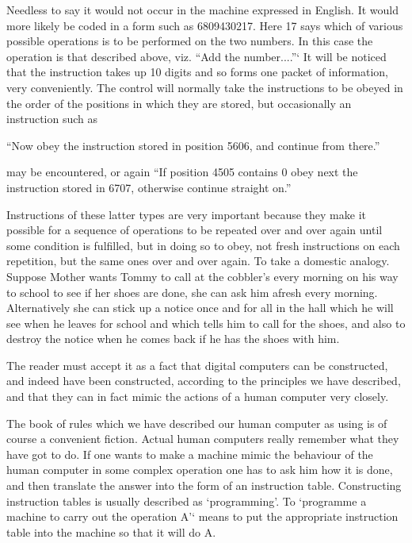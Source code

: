 \documentclass[10pt]{article} %
\begin{document}
Needless to say it would not occur in the machine expressed in English. It would more likely be coded in a form such as 6809430217. Here 17 says which of various possible operations is to be performed on the two numbers. In this case the operation is that described above, viz. ``Add the number....''` It will be noticed that the instruction takes up 10 digits and so forms one packet of information, very conveniently. The control will normally take the instructions to be obeyed in the order of the positions in which they are stored, but occasionally an instruction such as

\vspace{0.5\baselineskip} %
``Now obey the instruction stored in position 5606, and continue from there.''\par %
\vspace{0.5\baselineskip} %
may be encountered, or again
\vspace{0.5\baselineskip} %
``If position 4505 contains 0 obey next the instruction stored in 6707, otherwise continue straight on.''\par %
\vspace{0.5\baselineskip} %
Instructions of these latter types are very important because they make it possible for a sequence of operations to be repeated over and over again until some condition is fulfilled, but in doing so to obey, not fresh instructions on each repetition, but the same ones over and over again. To take a domestic analogy. Suppose Mother wants Tommy to call at the cobbler's every morning on his way to school to see if her shoes are done, she can ask him afresh every morning. Alternatively she can stick up a notice once and for all in the hall which he will see when he leaves for school and which tells him to call for the shoes, and also to destroy the notice when he comes back if he has the shoes with him.

The reader must accept it as a fact that digital computers can be constructed, and indeed have been constructed, according to the principles we have described, and that they can in fact mimic the actions of a human computer very closely.

The book of rules which we have described our human computer as using is of course a convenient fiction. Actual human computers really remember what they have got to do. If one wants to make a machine mimic the behaviour of the human computer in some complex operation one has to ask him how it is done, and then translate the answer into the form of an instruction table. Constructing instruction tables is usually described as `programming'. To `programme a machine to carry out the operation A'` means to put the appropriate instruction table into the machine so that it will do A.
\end{document}
